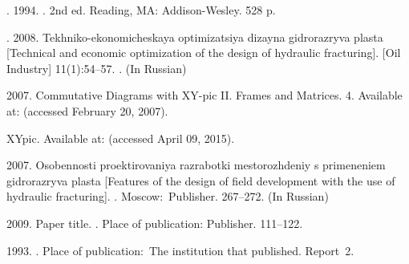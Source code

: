 \documentclass[12pt, twoside]{article}
\begin{document}
\begin{thebibliography}{99}

	. 1994.
	.
	2nd ed.
	Reading, MA: Addison-Wesley. 528 p.

	. 2008.
	Tekhniko-ekonomicheskaya optimizatsiya dizayna gidrorazryva plasta
	[Technical and economic optimization of the design of hydraulic fracturing].
	 [Oil Industry] 11(1):54--57.
	. (In Russian)

	 2007.
	Commutative Diagrams with XY-pic II. Frames and Matrices.
	  4.
	Available at: 
    (accessed February 20, 2007).

	XYpic.
	Available at: 
	(accessed April 09, 2015).

	 2007.
	Osobennosti proektirovaniya razrabotki mestorozhdeniy s primeneniem gidrorazryva plasta
	[Features of the design of field development with the use of hydraulic fracturing].
	.
	Moscow:~Publisher. 267--272. (In Russian)
	   	
     2009.
    Paper title.
    .
    Place of publication: Publisher. 111--122.
	
	 1993.
  	.
  	Place of publication:~The institution that published.  Report~2.
  	     	
\end{thebibliography}
\end{document}
